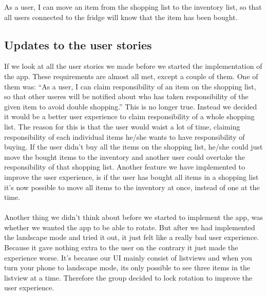 \documentclass[12pt]{article}
\begin{document}
As a user, I can move an item from the shopping list to the inventory list, so that all users connected to the fridge will know that the item has been bought.

\subsection{Updates to the user stories}
If we look at all the user stories we made before we started the implementation of the app. These requirements are almost all met, except a couple of them. One of them was: “As a user, I can claim responsibility of an item on the shopping list, so that other useres will be notified about who has taken responsibility of the given item to avoid double shopping.” This is no longer true. Instead we decided it would be a better user experience to claim responsibility of a whole shopping list. The reason for this is that the user would waist a lot of time, claiming responsibility of each individual items he/she wants to have responsibility of buying. If the user didn’t buy all the items on the shopping list, he/she could just move the bought items to the inventory and another user could overtake the responsibility of that shopping list. 
Another feature we have implemented to improve the user experience, is if the user has bought all items in a shopping list it’s now possible to move all items to the inventory at once, instead of one at the time.  
\\
\\
Another thing we didn’t think about before we started to implement the app, was whether we wanted the app to be able to rotate. But after we had implemented the landscape mode and tried it out, it just felt like a really bad user experience. Because it gave nothing extra to the user on the contrary it just made the experience worse. It’s because our UI mainly consist of listviews and when you  turn your phone to landscape mode, its only possible to see three items in the listview at a time. Therefore the group decided to lock rotation to improve the user experience.
\end{document}
